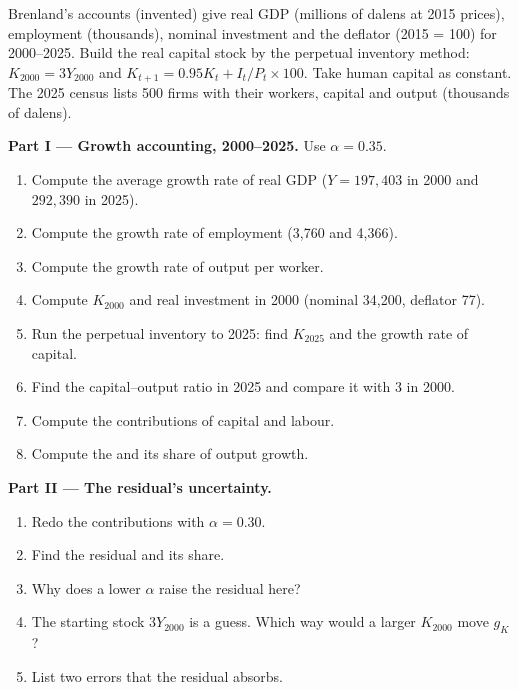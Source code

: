 \begin{problem}\label{pb:b1:growth-accounting:brenland}
Brenland's accounts (invented) give real GDP (millions of dalens at 2015
prices), employment (thousands), nominal investment and the deflator
(2015 = 100) for 2000--2025. Build the real capital stock by the perpetual
inventory method: $K_{2000} = 3Y_{2000}$ and $K_{t+1} = 0.95K_t + I_t/P_t \times 100$. Take human capital
as constant. The 2025 census lists 500 firms with their workers, capital
and output (thousands of dalens).

\medskip\noindent\textbf{Part I --- Growth accounting, 2000--2025.} Use $\alpha = 0.35$.
\begin{enumerate}
  \item Compute the average growth rate of real GDP ($Y = 197{,}403$ in 2000 and $292{,}390$ in 2025).
  \item Compute the growth rate of employment (3,760 and 4,366).
  \item Compute the growth rate of output per worker.
  \item Compute $K_{2000}$ and real investment in 2000 (nominal 34,200, deflator 77).
  \item Run the perpetual inventory to 2025: find $K_{2025}$ and the growth rate of capital.
  \item Find the capital--output ratio in 2025 and compare it with 3 in 2000.
  \item Compute the contributions of capital and labour.
  \item Compute the  and its share of output growth.
\end{enumerate}

\medskip\noindent\textbf{Part II --- The residual's uncertainty.}
\begin{enumerate}[resume]
  \item Redo the contributions with $\alpha = 0.30$.
  \item Find the residual and its share.
  \item Why does a lower $\alpha$ raise the residual here?
  \item The starting stock $3Y_{2000}$ is a guess. Which way would a larger $K_{2000}$ move $g_K$?
  \item List two errors that the residual absorbs.
\end{enumerate}


\end{problem}
